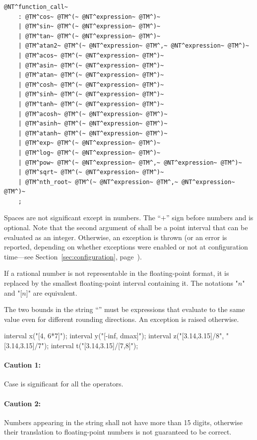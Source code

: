 \documentclass{manual}
\begin{document}
\begin{Verbatim}[commandchars=\@\^\~]
@NT^function_call~
	: @TM^cos~ @TM^(~ @NT^expression~ @TM^)~
	| @TM^sin~ @TM^(~ @NT^expression~ @TM^)~
	| @TM^tan~ @TM^(~ @NT^expression~ @TM^)~
	| @TM^atan2~ @TM^(~ @NT^expression~ @TM^,~ @NT^expression~ @TM^)~
	| @TM^acos~ @TM^(~ @NT^expression~ @TM^)~
	| @TM^asin~ @TM^(~ @NT^expression~ @TM^)~
	| @TM^atan~ @TM^(~ @NT^expression~ @TM^)~
	| @TM^cosh~ @TM^(~ @NT^expression~ @TM^)~
	| @TM^sinh~ @TM^(~ @NT^expression~ @TM^)~
	| @TM^tanh~ @TM^(~ @NT^expression~ @TM^)~
	| @TM^acosh~ @TM^(~ @NT^expression~ @TM^)~
	| @TM^asinh~ @TM^(~ @NT^expression~ @TM^)~
	| @TM^atanh~ @TM^(~ @NT^expression~ @TM^)~
	| @TM^exp~ @TM^(~ @NT^expression~ @TM^)~
	| @TM^log~ @TM^(~ @NT^expression~ @TM^)~
	| @TM^pow~ @TM^(~ @NT^expression~ @TM^,~ @NT^expression~ @TM^)~
	| @TM^sqrt~ @TM^(~ @NT^expression~ @TM^)~
	| @TM^nth_root~ @TM^(~ @NT^expression~ @TM^,~ @NT^expression~ @TM^)~
	;
\end{Verbatim}

Spaces are not significant except in numbers. The ``$+$'' sign before
numbers and  is optional.
Note that the second argument of  shall be a point interval that can be evaluated
as an integer. Otherwise, an  exception is thrown (or an error is 
reported, depending on whether exceptions were enabled or not at configuration time---see Section~\ref{sec:configuration}, page~\pageref{sec:configuration}).

If a rational number is not representable in the floating-point format, it is
replaced by the smallest floating-point interval containing it. The notations
"$n$" and "[$n$]" are equivalent.

The two bounds in the string ``'' must be expressions that evaluate to the same value even for different rounding directions. An
 exception is raised otherwise.

\begin{example}
interval x("[4, 6*7]");
interval y("[-inf, dmax]");
interval z("[3.14,3.15]/8", "[3.14,3.15]/7");
interval t("[3.14,3.15]/[7,8]");
\end{example}

\paragraph*{Caution 1:} Case is significant for all the operators.

\paragraph*{Caution 2:} Numbers appearing in the string shall not have more than 
15 digits, otherwise their translation to floating-point numbers is not 
guaranteed to be correct.
\end{document}
